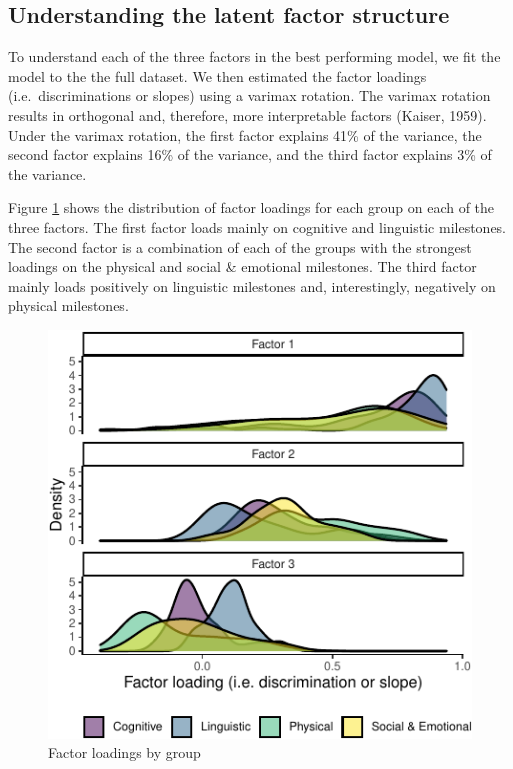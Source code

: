 \documentclass[10pt, letterpaper]{article}
\newenvironment{CodeChunk}{}{}
\begin{document}
\hypertarget{understanding-the-latent-factor-structure}{%
\subsection{Understanding the latent factor
structure}\label{understanding-the-latent-factor-structure}}

To understand each of the three factors in the best performing model, we
fit the model to the the full dataset. We then estimated the factor
loadings (i.e.~discriminations or slopes) using a varimax rotation. The
varimax rotation results in orthogonal and, therefore, more
interpretable factors (Kaiser, 1959). Under the varimax rotation, the
first factor explains 41\% of the variance, the second factor explains
16\% of the variance, and the third factor explains 3\% of the variance.

Figure \ref{fig:factorloadings} shows the distribution of factor
loadings for each group on each of the three factors. The first factor
loads mainly on cognitive and linguistic milestones. The second factor
is a combination of each of the groups with the strongest loadings on
the physical and social \& emotional milestones. The third factor mainly
loads positively on linguistic milestones and, interestingly, negatively
on physical milestones.

\begin{CodeChunk}
\begin{figure}[tb]
\includegraphics{figs/factorloadings-1} \caption[Factor loadings by group]{Factor loadings by group}\label{fig:factorloadings}
\end{figure}
\end{CodeChunk}
\end{document}
